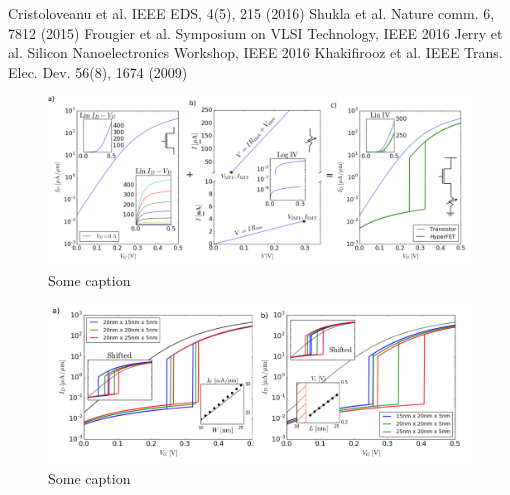 \setlength{\multicolsep}{0em}
\begin{multicols}{2}
{\fontsize{9pt}{9pt}\selectfont

\frenchspacing

\renewcommand{\section}[2]{}
\begin{thebibliography}{9} 

Cristoloveanu et al.  IEEE EDS, 4(5), 215 (2016)
Shukla et al. Nature comm. 6, 7812 (2015)
Frougier et al. Symposium on VLSI Technology, IEEE 2016
Jerry et al. Silicon Nanoelectronics Workshop, IEEE 2016
Khakifirooz et al.  IEEE Trans. Elec. Dev. 56(8), 1674 (2009)

\end{thebibliography}
}
\end{multicols}

\pagebreak

\begin{figure}[!ht]
  \centering
  \includegraphics[width=\textwidth]{images/HyperFETConstruction}
  \caption{Some caption}
  \label{fig:HyperFETConstruction}
\end{figure}
\begin{figure}[!ht]
  \centering
  \includegraphics[width=\textwidth]{images/HFvsGeo}
  \caption{Some caption}
  \label{fig:HFvsGeo}
\end{figure}


